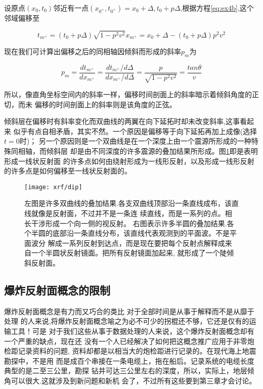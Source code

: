 设原点$(x_{0},t_{0})$邻近有一点$(x_{0^{+}},t_{0^{+}})=x_{0}+\Delta, t_{0}+p\Delta$,根据方程\ref{eq:ex4b},这个邻域偏移至

\begin{subequations}\label{eq:ex5}
\begin{equation}
t_{m^{+}}=(t_{0}+p\Delta)\sqrt{1-p^{2}v^{2}}　\label{eq:ex5a}
\end{equation}
\begin{equation}
x_{m^{+}}=x_{0}+\Delta-(t_{0}+p\Delta)p^{2}v^{2} \label{eq:ex5b}
\end{equation}
\end{subequations}

现在我们可计算出偏移之后的同相轴因倾斜而形成的斜率$p_{m}$为

\begin{equation}
p_{m}
=\frac{dt_{m^{+}}}{dx_{m^{+}}}
=\frac{dt_{m^{+}}/d\Delta}{dx_{m^{+}}/d\Delta}
=\frac{p}{\sqrt{1-p^{2}v^{2}}}
=\frac{tan\theta}{v}
\label{eq:ex6}
\end{equation}

所以，像直角坐标空间内的斜率一样，偏移时间剖面上的斜率暗示着倾斜角度的正切，而未
偏移的时间剖面上的斜率则是该角度的正弦。

倾斜层在偏移时有斜率变化而双曲线的两翼在向下延拓时却未改变斜率,这事看起来
似乎有点自相矛盾，其实不然。一个原因是偏移等于向下延拓再加上成像(选择$t=0$时)；
另一个原因则是一个双曲线是在一个深度上由一个震源所形成的一种特殊同相轴，而倾斜层
却是由不同深度的许多震源的叠加结果所形成。图\ref{fig:xrf/dip}即是表明形成一线状反射面
的许多点如何由绕射形成为一线形反射，以及形成一线形反射的许多点是如何偏移至一线状反射面的。

\begin{figure}[H]
\centering
\texttt{[image: xrf/dip]}
\caption[dip]{
    左图是许多双曲线的叠加结果.各支双曲线顶部沿一条直线成布，该直线就像是反射面，不过并不是一条连
    续直线，而是一系列的点。相长干涉形成一个向一侧的视反射。
    右图表示许多半圆的叠加结果.各个半圆的底部沿一条直线分布，该直线代表观测到的平面波。不是平面波分
    解成一系列反射到达点，而是现在要把每个反射点解释成来自一个半圆状反射镜面。把所有反射镜面加起来,
    就形成了一个陡倾斜反射面。
}
\label{fig:xrf/dip}
\end{figure}
    
\subsection{爆炸反射面概念的限制}
    爆炸反射面概念是有力而又巧合的类比
    对于全部时间是从事于解释而不是从靡于处理
    的人来说,将爆炸反射面概念喻之为必不可少的拐棍还不够，它还是仅有的运输工具！可是
    对于我们这些从事于数据处理的人来说，这个爆炸反射面概念却有一个严重的缺点，现在还
    没有一个人已经解决了如何把这概念推广应用于非零炮检距记录资料的问题,
    资料却都是以相当大的炮检距进行记录的。在现代海上地震勘探中，不是用
    而是成百个串接在一条电缆上，拖在船后。记录系统的电缆长度典型的是二至三公里，勘探
    钻井可达三公里左右的深度，所以，实际上，地层倾角可以很大.这就涉及到新问题和新机
    会了，不过所有这些要到第三章才会讨论。
    

